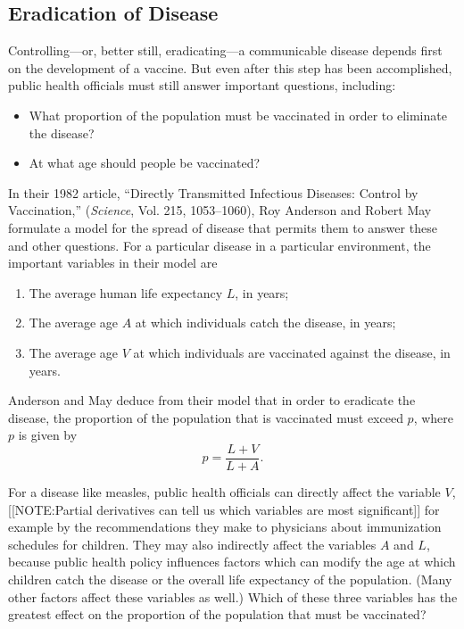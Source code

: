 \subsection{Eradication of Disease}
\label{subsec:eradication-of-disease}

Controlling---or, better still, eradicating---a communicable disease
depends first on the development of a vaccine.  But even after this
step has been accomplished, public health officials must still answer
important questions, including:

\begin{itemize}

\item What proportion of the population must be vaccinated in order to
  eliminate the disease?

\item  At what age should people be vaccinated? 

\end{itemize}

In their 1982 article, ``Directly Transmitted Infectious Diseases:
Control by Vaccination,'' ({\em Science}, Vol. 215, 1053--1060), Roy
Anderson and Robert May formulate a model
for the spread of disease that permits them to answer these and other
questions.  For a particular disease in a particular environment, the
important variables in their model are
\begin{enumerate}

\item  The average human life expectancy $L$, in years;

\item The average age $A$ at which individuals catch the disease, in
  years;

\item The average age $V$ at which individuals are vaccinated against
  the disease, in years.
\end{enumerate}

Anderson and May deduce from their model that in order to eradicate
the disease, the proportion of the population that is vaccinated must
exceed $p$, where $p$ is given by
\[
p = \frac{L + V}{L + A}.
\] 

For a disease like measles, public health officials can directly
affect the variable $V$,
[[NOTE:Partial derivatives can tell us which variables are most significant]]     
for example by the recommendations they make to physicians about
immunization schedules for children.  They may also indirectly affect
the variables $A$ and $L$, because public health policy influences
factors which can modify the age at which children catch the disease
or the overall life expectancy of the population.  (Many other factors
affect these variables as well.)  Which of these three variables has
the greatest effect on the proportion of the population that must be
vaccinated?

